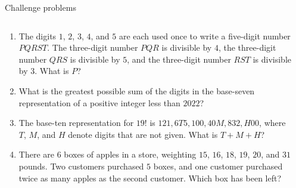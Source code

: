 \documentclass[9pt,aspectratio=169]{beamer}
\begin{document}
\begin{frame}{Challenge problems}
  \begin{columns}[T]
    \begin{column}{0.5\textwidth}
      \begin{enumerate}
        \item The digits $1$, $2$, $3$, $4$, and $5$ are each used once to write a five-digit number $PQRST$. The three-digit number $PQR$ is divisible by $4$, the three-digit number $QRS$ is divisible by $5$, and the three-digit number $RST$ is divisible by $3$. What is $P$?
        \item What is the greatest possible sum of the digits in the base-seven representation of a positive integer less than $2022$?
        \item The base-ten representation for $19!$ is $121{,}6T5{,}100{,}40M{,}832{,}H00$, where $T$, $M$, and $H$ denote digits that are not given. What is $T+M+H$?
        \item There are $6$ boxes of apples in a store, weighting $15$, $16$, $18$, $19$, $20$, and $31$ pounds. Two customers purchased $5$ boxes, and one customer purchased twice as many apples as the second customer. Which box has been left?  
      \end{enumerate}
    \end{column}
    \begin{column}{0.5\textwidth}
    \end{column}
  \end{columns}
\end{frame}

\end{document}
